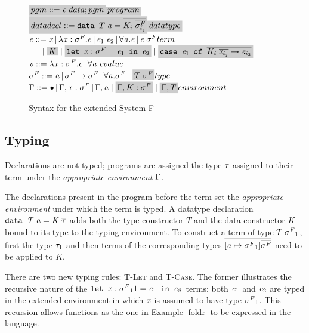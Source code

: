\begin{figure}
  $\highlight{pgm::= \term\;data;pgm}\hfill \highlight{program}$\\
  $ \highlight{datadecl::=\mathit{\texttt{data }} T\; \tyVar = \overline{K_i \;\overline{\sigma^F_{i_j}}}}\hfill \highlight{datatype}$\\
  $\term ::= \tmVar\,|\,\lambda \tmVar:\typeF.\term\,|\,\term_1 \; \term_2 \,|\,\tyAbs{\tyVar}{\term}\,|\,\term\;\typeF \hfill term $\\
 $\phantom{aaa}|\;\highlight{K} \;|\;\highlight{\mathit{\texttt{let }} \tmVar : \typeF = \term_1 \mathit{\texttt{ in }} \term_2} \;|\;\highlight{ \mathit{\texttt{case }} \term_1 \mathit{\texttt{ of }} \overline{K_i \; \overline{\tmVar_{i_j}} \rightarrow \term_{i_2}}} $\\
  $\tmVal::= \lambda \tmVar:\typeF.\term \,|\,\tyAbs{\tyVar}{\term}\hfill value$\\
  $\typeF ::= \tyVar\,|\,\typeF \rightarrow \typeF \,|\,\forall \tyVar.\typeF\;|\; \highlight{T\;\typeF} \hfill type$\\
  $\tyEnv::=  \bullet \,|\, \tyEnv, \tmVar:\typeF\,|\, \tyEnv,\tyVar\;|\; \highlight{\tyEnv,K:\typeF}\;|\;\highlight{\tyEnv,T} \hfill environment$\\
  \caption{Syntax for the extended System F}
  \label{exsysfsyntax}
\end{figure}
\subsection{Typing}
Declarations are not typed; programs are assigned the type $\mathit{\tau}$ assigned to their term  under the \textit{appropriate environment} $\Gamma$.

The declarations present in the program before the term set the \textit{appropriate environment} under which the term is typed. A datatype declaration $\mathit{\texttt{data } T\; \mathit{a} = K \;\overline{\mathit{\tau}}}$ adds both the type constructor $T$ and the data constructor $K$ bound to its type to the typing environment. To construct a term of type $T\;\mathit{\sigma^F}_1$, first the type $\mathit{\tau}_1$ and then terms of the corresponding types $\overline{[\mathit{a}\mapsto\mathit{\sigma^F}_1]\overline{\mathit{\sigma^F}}}$ need to be applied to $K$.

There are two new typing rules: \textsc{T-Let} and \textsc{T-Case}. The former illustrates the recursive nature of the $\mathit{\texttt{let }} \mathit{x} : \mathit{\sigma^F}_11 = \mathit{e}_1 \mathit{\texttt{ in }\mathit{e}_2}$ terms: both $\mathit{e}_1$ and $\mathit{e}_2$ are typed in the extended environment in which $\mathit{x}$ is assumed to have type $\mathit{\sigma^F}_1$. This recursion allows functions as the one in Example \ref{foldr} to be expressed in the language.

